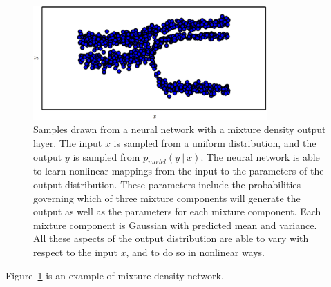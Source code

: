\begin{itemize}
    \setcounter{figure}{3}
    \begin{figure}[ht]
      \begin{center}
        \includegraphics[width=0.8\textwidth]{FIG/fig6_4.PNG}
        \caption{Samples drawn from a neural network with a mixture density output layer.
          The input $x$ is sampled from a uniform distribution,
          and the output $y$ is sampled from $p _ {model} (y\ |\ x)$.
          The neural network is able to learn nonlinear mappings from the input to the parameters of the output distribution.
          These parameters include the probabilities governing which of three mixture components will generate the output as well as the parameters for each mixture component.
          Each mixture component is Gaussian with predicted mean and variance.
          All these aspects of the output distribution are able to vary with respect to the input $x$,
          and to do so in nonlinear ways.
        }\label{fig:NN_mixture_density_output_layer}
      \end{center}
    \end{figure}

    Figure~\ref{fig:NN_mixture_density_output_layer} is an example of mixture density network.

  \end{itemize}

